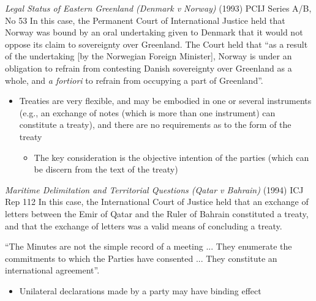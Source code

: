 \begin{casedetails}{\textit{Legal Status of Eastern Greenland (Denmark v Norway)} (1993) PCIJ Series A/B, No 53}
    \flushleft
    In this case, the Permanent Court of International Justice held that Norway was bound by an oral undertaking given to Denmark that it would not oppose its claim to sovereignty over Greenland. The Court held that ``as a result of the undertaking [by the Norwegian Foreign Minister], Norway is under an obligation to refrain from contesting Danish sovereignty over Greenland as a whole, and \textit{a fortiori} to refrain from occupying a part of Greenland''.
\end{casedetails}

\begin{itemize}
    \item Treaties are very flexible, and may be embodied in one or several instruments (e.g., an exchange of notes (which is more than one instrument) can constitute a treaty), and there are no requirements as to the form of the treaty
    \begin{itemize}
        \item The key consideration is the objective intention of the parties (which can be discern from the text of the treaty)
    \end{itemize}
\end{itemize}

\begin{casedetails}{\textit{Maritime Delimitation and Territorial Questions (Qatar v Bahrain)} (1994) ICJ Rep 112}\label{case:Qatar v Bahrain}
    \flushleft
    In this case, the International Court of Justice held that an exchange of letters between the Emir of Qatar and the Ruler of Bahrain constituted a treaty, and that the exchange of letters was a valid means of concluding a treaty.
    
    \vspace{\baselineskip}

    ``The Minutes are not the simple record of a meeting ... They enumerate the commitments to which the Parties have consented ... They constitute an international agreement''.

\end{casedetails}

\begin{itemize}
    \item Unilateral declarations made by a party may have binding effect
\end{itemize}

